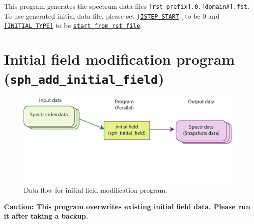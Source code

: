 %
This program generates the spectrum data files \verb|[rst_prefix].0.[domain#].fst|. To use generated initial data file, please set 
 \hyperref[href_t:i_step_init_ctl]{{\tt [ISTEP\_START]}} to be 0 and \hyperref[href_t:restart_file_ctl]{{\tt [INITIAL\_TYPE]}} to be \hyperref[href_t:restart_file_ctl]{{\tt start\_from\_rst\_file}}.

\section{Initial field modification program \\
({\tt sph\_add\_initial\_field})}
\label{sec:ad_initial_field}
%
\begin{figure}[htbp]
\begin{center}
\includegraphics*[width=130mm]{images/flow_ini}
\end{center}
\caption{Data flow for initial field modification program.}
\label{fig:flow_add_ini}
\end{figure}
%
{\bf Caution: This program overwrites existing initial field data. Please run it after taking a backup.} \\

